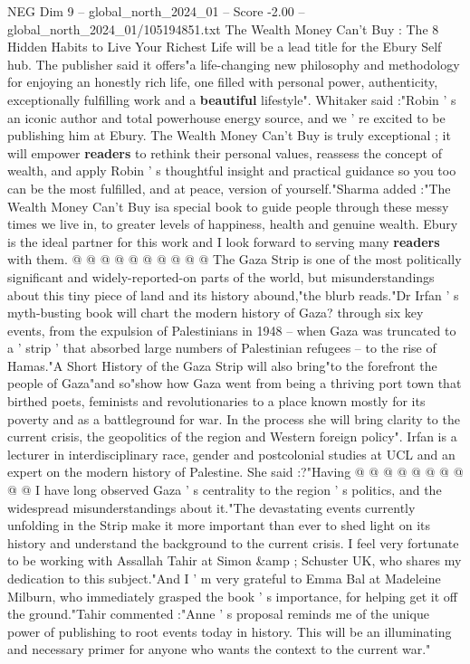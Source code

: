 \begin{textsample}{NEG Dim 9 – global\_north\_2024\_01 – Score -2.00 – global\_north\_2024\_01/105194851.txt}  \label{ex:f9_neg_191}
The Wealth Money Can't Buy : The 8 Hidden Habits to Live Your Richest Life will be a lead title for the Ebury Self hub.
The publisher said it offers"a life-changing new philosophy and methodology for enjoying an honestly rich life, one filled with personal power, authenticity, exceptionally fulfilling work and a \textbf{beautiful} lifestyle".
Whitaker said :"Robin ' s an iconic author and total powerhouse energy source, and we ' re excited to be publishing him at Ebury.
The Wealth Money Can't Buy is truly exceptional ; it will empower \textbf{readers} to rethink their personal values, reassess the concept of wealth, and apply Robin ' s thoughtful insight and practical guidance so you too can be the most fulfilled, and at peace, version of yourself."Sharma added :"The Wealth Money Can't Buy isa special book to guide people through these messy times we live in, to greater levels of happiness, health and genuine wealth.
Ebury is the ideal partner for this work and I look forward to serving many \textbf{readers} with them. @ @ @ @ @ @ @ @ @ @ The Gaza Strip is one of the most politically significant and widely-reported-on parts of the world, but misunderstandings about this tiny piece of land and its history abound,"the blurb reads."Dr Irfan ' s myth-busting book will chart the modern history of Gaza? through six key events, from the expulsion of Palestinians in 1948 -- when Gaza was truncated to a ' strip ' that absorbed large numbers of Palestinian refugees -- to the rise of Hamas."A Short History of the Gaza Strip will also bring"to the forefront the people of Gaza"and so"show how Gaza went from being a thriving port town that birthed poets, feminists and revolutionaries to a place known mostly for its poverty and as a battleground for war.
In the process she will bring clarity to the current crisis, the geopolitics of the region and Western foreign policy".
Irfan is a lecturer in interdisciplinary race, gender and postcolonial studies at UCL and an expert on the modern history of Palestine.
She said :?"Having @ @ @ @ @ @ @ @ @ @ I have long observed Gaza ' s centrality to the region ' s politics, and the widespread misunderstandings about it."The devastating events currently unfolding in the Strip make it more important than ever to shed light on its history and understand the background to the current crisis.
I feel very fortunate to be working with Assallah Tahir at Simon \&amp ; Schuster UK, who shares my dedication to this subject."And I ' m very grateful to Emma Bal at Madeleine Milburn, who immediately grasped the book ' s importance, for helping get it off the ground."Tahir commented :"Anne ' s proposal reminds me of the unique power of publishing to root events today in history.
This will be an illuminating and necessary primer for anyone who wants the context to the current war."

\end{textsample}
